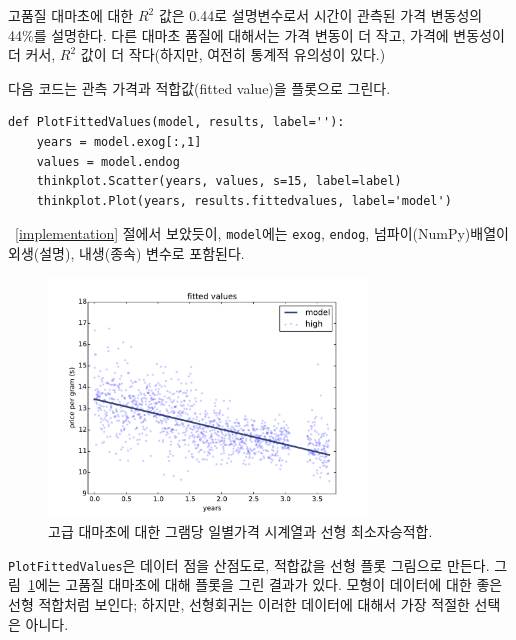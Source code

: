 
고품질 대마초에 대한 $R^2$ 값은 0.44로 설명변수로서 시간이 관측된 가격 변동성의 44\%를 설명한다.
다른 대마초 품질에 대해서는 가격 변동이 더 작고, 가격에 변동성이 더 커서, $R^2$ 값이 더 작다(하지만, 여전히 통계적 유의성이 있다.)

다음 코드는 관측 가격과 적합값(fitted value)을 플롯으로 그린다.

\begin{verbatim}
def PlotFittedValues(model, results, label=''):
    years = model.exog[:,1]
    values = model.endog
    thinkplot.Scatter(years, values, s=15, label=label)
    thinkplot.Plot(years, results.fittedvalues, label='model')
\end{verbatim}

~\ref{implementation} 절에서 보았듯이, {\tt model}에는 {\tt exog}, {\tt endog}, 넘파이(NumPy)배열이 외생(설명), 내생(종속) 변수로 포함된다.

\begin{figure}
\centerline{\includegraphics[height=2.5in]{figs/timeseries2.pdf}}
\caption{고급 대마초에 대한 그램당 일별가격 시계열과 선형 최소자승적합.}
\label{timeseries2}
\end{figure}

{\tt PlotFittedValues}은 데이터 점을 산점도로, 적합값을 선형 플롯 그림으로 만든다. 그림~\ref{timeseries2}에는 고품질 대마초에 대해 플롯을 그린 결과가 있다. 모형이 데이터에 대한 좋은 선형 적합처럼 보인다; 하지만, 선형회귀는 이러한 데이터에 대해서 가장 적절한 선택은 아니다.

